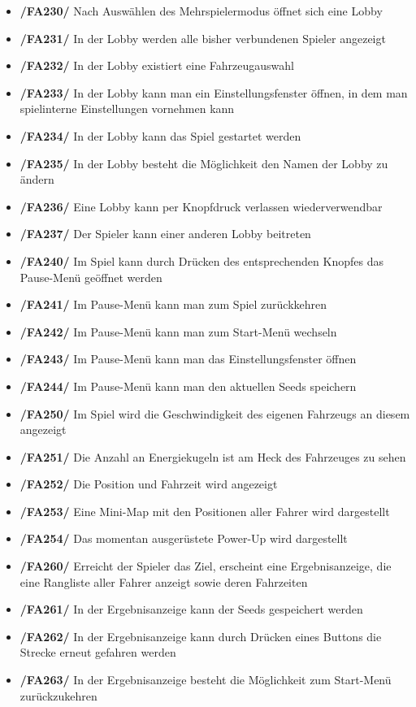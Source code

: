 \documentclass[parskip=full]{scrartcl}
\begin{document}
\begin{itemize} [label={}]
		\item \textbf{/FA230/} Nach Auswählen des Mehrspielermodus öffnet sich eine Lobby
		\item \textbf{/FA231/} In der Lobby werden alle bisher verbundenen Spieler angezeigt
		\item \textbf{/FA232/} In der Lobby existiert eine Fahrzeugauswahl
		\item \textbf{/FA233/} In der Lobby kann man ein Einstellungsfenster öffnen, in dem man spielinterne Einstellungen vornehmen kann
		\item \textbf{/FA234/} In der Lobby kann das Spiel gestartet werden
		\item \textbf{/FA235/} In der Lobby besteht die Möglichkeit den Namen der Lobby zu ändern
		\item \textbf{/FA236/} Eine Lobby kann per Knopfdruck verlassen wiederverwendbar
		\item \textbf{/FA237/} Der Spieler kann einer anderen Lobby beitreten
		
		\item \textbf{/FA240/} Im Spiel kann durch Drücken des entsprechenden Knopfes das Pause-Menü geöffnet werden
		\item \textbf{/FA241/} Im Pause-Menü kann man zum Spiel zurückkehren
		\item \textbf{/FA242/} Im Pause-Menü kann man zum Start-Menü wechseln
		\item \textbf{/FA243/} Im Pause-Menü kann man das Einstellungsfenster öffnen
		\item \textbf{/FA244/} Im Pause-Menü kann man den aktuellen \glspl{Seed} speichern
		
		\item \textbf{/FA250/} Im Spiel wird die Geschwindigkeit des eigenen Fahrzeugs an diesem angezeigt
		\item \textbf{/FA251/} Die Anzahl an Energiekugeln ist am Heck des Fahrzeuges zu sehen
		\item \textbf{/FA252/} Die Position und Fahrzeit wird angezeigt
		\item \textbf{/FA253/} Eine Mini-Map mit den Positionen aller Fahrer wird dargestellt
		\item \textbf{/FA254/} Das momentan ausgerüstete Power-Up wird dargestellt
		
		\item \textbf{/FA260/} Erreicht der Spieler das Ziel, erscheint eine Ergebnisanzeige, die eine Rangliste aller Fahrer anzeigt sowie deren Fahrzeiten
		\item \textbf{/FA261/} In der Ergebnisanzeige kann der \glspl{Seed} gespeichert werden
		\item \textbf{/FA262/} In der Ergebnisanzeige kann durch Drücken eines Buttons die Strecke erneut gefahren werden
		\item \textbf{/FA263/} In der Ergebnisanzeige besteht die Möglichkeit zum Start-Menü zurückzukehren
	\end{itemize}
\end{document}
